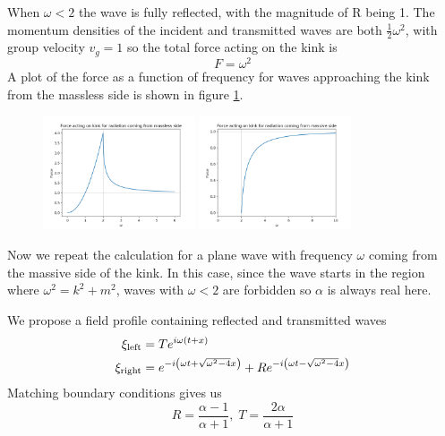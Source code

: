 \documentclass[11pt, oneside]{article}  	%
\numberwithin{equation}{section}
\begin{document}
When $\omega<2$ the wave is fully reflected, with the magnitude of R being 1. The momentum densities of the incident and transmitted waves are both $\frac{1}{2}\omega^2$, with group velocity $v_g=1$ so the total force acting on the kink is 
\begin{equation}
F = \omega^2
\end{equation}
A plot of the force as a function of frequency for waves approaching the kink from the massless side is shown in figure \ref{force_left}.\par
\begin{figure}
\centering
\includegraphics[width=0.4\textwidth]{force_left.png}
\includegraphics[width=0.4\textwidth]{force_right.png}
 \label{force_left}
\end{figure}
Now we repeat the calculation for a plane wave with frequency $\omega$ coming from the massive side of the kink. In this case, since the wave starts in the region where $\omega^2 = k^2 + m^2$, waves with $\omega < 2$ are forbidden so $\alpha$ is always real here. \par
We propose a field profile containing reflected and transmitted waves
\begin{align}
\xi_\textup{left} &= T e^{i\omega (t+x)}\\
\xi_\textup{right} &= e^{-i\left( \omega t + \sqrt{\omega^2-4} x \right )} + Re^{-i\left( \omega t - \sqrt{\omega^2-4} x \right )} 
\end{align}
Matching boundary conditions gives us
\begin{equation}
R = \frac{\alpha-1}{\alpha+1},\; T = \frac{2\alpha}{\alpha+1}
\end{equation}
\end{document}
